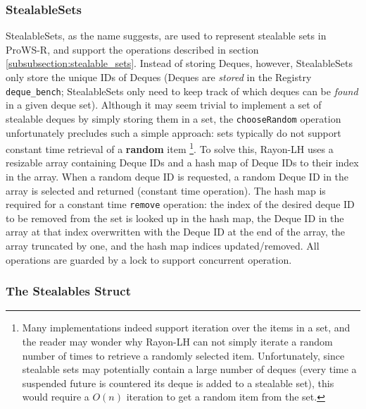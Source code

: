 \documentclass[bsc,frontabs,singlespacing,parskip,deptreport,normalheadings]{infthesis}
\begin{document}
\subsubsection*{StealableSets}

StealableSets, as the name suggests, are used to represent stealable sets in
ProWS-R, and support the operations described in section
\ref{subsubsection:stealable_sets}. Instead of storing Deques, however,
StealableSets only store the unique IDs of Deques (Deques are \textit{stored} in
the Registry \texttt{deque\_bench}; StealableSets only need to keep track of
which deques can be \textit{found} in a given deque set). Although it may seem
trivial to implement a set of stealable deques by simply storing them in a set,
the \texttt{chooseRandom} operation unfortunately precludes such a simple
approach: sets typically do not support constant time retrieval of a
\textbf{random} item \footnote{Many implementations indeed support iteration
    over the items in a set, and the reader may wonder why Rayon-LH can not
    simply iterate a random number of times to retrieve a randomly selected
    item. Unfortunately, since stealable sets may potentially contain a large
    number of deques (every time a suspended future is countered its deque is
    added to a stealable set), this would require a \(O(n)\) iteration to get a
random item from the set.}. To solve this, Rayon-LH uses a resizable array
containing Deque IDs and a hash map of Deque IDs to their index in the
array. When a random deque ID is requested, a random Deque ID in the array
is selected and returned (constant time operation). The hash map is required for
a constant time \texttt{remove} operation: the index of the desired deque ID to
be removed from the set is looked up in the hash map, the Deque ID in the array
at that index overwritten with the Deque ID at the end of the array, the array
truncated by one, and the hash map indices updated/removed. All operations are
guarded by a lock to support concurrent operation.

\subsubsection*{The Stealables Struct}
\end{document}
